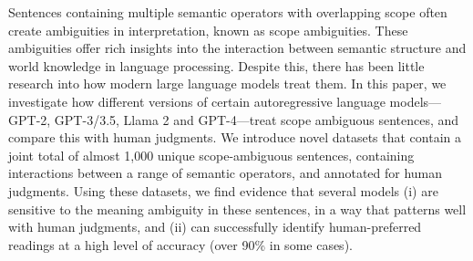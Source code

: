 Sentences containing multiple semantic operators with overlapping scope often create ambiguities in interpretation, known as scope ambiguities. These ambiguities offer rich insights into the interaction between semantic structure and world knowledge in language processing. Despite this, there has been little research into how modern large language models treat them. In this paper, we investigate how different versions of certain autoregressive language models—GPT-2, GPT-3/3.5, Llama 2 and GPT-4—treat scope ambiguous sentences, and compare this with human judgments. We introduce novel datasets that contain a joint total of almost 1,000 unique scope-ambiguous sentences, containing interactions between a range of semantic operators, and annotated for human judgments. Using these datasets, we find evidence that several models (i) are sensitive to the meaning ambiguity in these sentences, in a way that patterns well with human judgments, and (ii) can successfully identify human-preferred readings at a high level of accuracy (over 90\% in some cases).